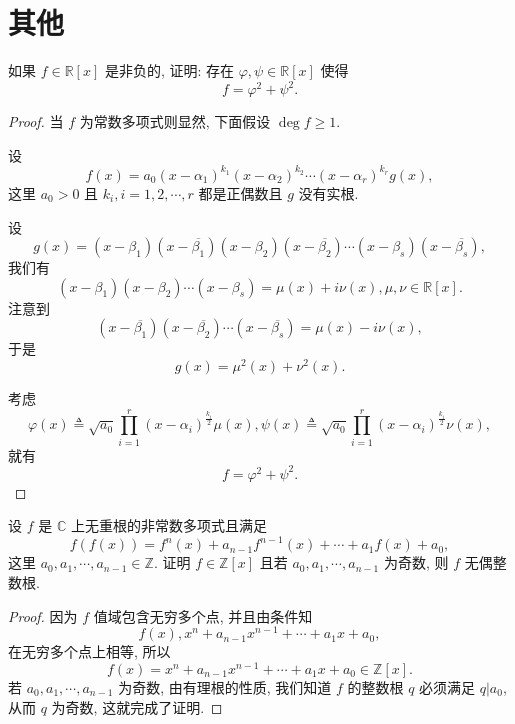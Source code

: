 \documentclass[../../main.tex]{subfiles}%
\begin{document}
\section{其他}

\begin{example}
如果 \( f \in \mathbb{R}[x] \) 是非负的, 证明: 存在 \( \varphi, \psi \in \mathbb{R}[x] \) 使得
\[
f = \varphi^2 + \psi^2.
\]
\end{example}
\begin{proof}

当 \( f \) 为常数多项式则显然, 下面假设 \( \deg f \geqslant 1 \).

设
\[
f(x) = a_0 (x - \alpha_1)^{k_1} (x - \alpha_2)^{k_2} \cdots (x - \alpha_r)^{k_r} g(x),
\]
这里 \( a_0 > 0 \) 且 \( k_i, i = 1,2,\cdots,r \) 都是正偶数且 \( g \) 没有实根.

设
\[
g(x) = (x - \beta_1)(x - \overline{\beta_1})(x - \beta_2)(x - \overline{\beta_2}) \cdots (x - \beta_s)(x - \overline{\beta_s}),
\]
我们有
\[
(x - \beta_1)(x - \beta_2) \cdots (x - \beta_s) = \mu(x) + i\nu(x), \mu, \nu \in \mathbb{R}[x].
\]
注意到
\[
(x - \overline{\beta_1})(x - \overline{\beta_2}) \cdots (x - \overline{\beta_s}) = \mu(x) - i\nu(x),
\]
于是
\[
g(x) = \mu^2(x) + \nu^2(x).
\]

考虑
\[
\varphi(x) \triangleq \sqrt{a_0} \prod_{i=1}^r (x - \alpha_i)^{\frac{k_i}{2}} \mu(x), \psi(x) \triangleq \sqrt{a_0} \prod_{i=1}^r (x - \alpha_i)^{\frac{k_i}{2}} \nu(x),
\]
就有
\[
f = \varphi^2 + \psi^2.
\]

\end{proof}

\begin{example}
设 \( f \) 是 \( \mathbb{C} \) 上无重根的非常数多项式且满足
\[
f(f(x)) = f^n(x) + a_{n-1}f^{n-1}(x) + \cdots + a_1f(x) + a_0,
\]
这里 \( a_0, a_1, \cdots, a_{n-1} \in \mathbb{Z} \). 证明 \( f \in \mathbb{Z}[x] \) 且若 \( a_0, a_1, \cdots, a_{n-1} \) 为奇数, 则 \( f \) 无偶整数根.
\end{example}
\begin{proof}

因为 \( f \) 值域包含无穷多个点, 并且由条件知
\[
f(x), x^n + a_{n-1}x^{n-1} + \cdots + a_1x + a_0,
\]
在无穷多个点上相等, 所以
\[
f(x) = x^n + a_{n-1}x^{n-1} + \cdots + a_1x + a_0 \in \mathbb{Z}[x].
\]
若 \( a_0, a_1, \cdots, a_{n-1} \) 为奇数, 由有理根的性质, 我们知道 \( f \) 的整数根 \( q \) 必须满足 \( q|a_0 \), 从而 \( q \) 为奇数, 这就完成了证明.

\end{proof}
\end{document}
